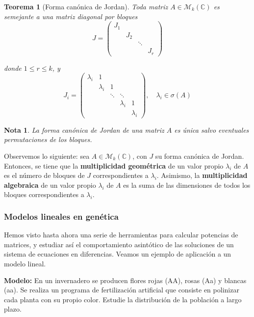 \documentclass[11pt, a4paper]{article}
\newif\IfInSansMode
\numberwithin{equation}{section}
\newcommand{\la}{\lambda}
\theoremstyle{theorem-style}
\newtheorem{nth}{Teorema}[section]
\theoremstyle{definition-style}
\theoremstyle{remark-style}
\newtheorem*{nota}{Nota}
\theoremstyle{example-style}
\begin{document}
\begin{nth}[Forma canónica de Jordan]
  Toda matriz $A \in \mathcal M_k (\mathbb C)$ es semejante a una matriz
  diagonal por bloques $$ J =
  \begin{pmatrix}
    J_1 & & & \\
    & J_2 & & \\
    & & \ddots & \\
    & & & J_r
  \end{pmatrix}$$

  donde $1 \leq r \leq k$, y $$J_i = 
  \begin{pmatrix}
	\la_i & 1\\
	& \la_i & 1 \\
	& & \ddots & \ddots \\
	& & & \la_i & 1 \\
	& & & & \la_i
\end{pmatrix}, \quad \lambda_i \in \sigma(A)$$

\end{nth}

\begin{nota}
	La forma canónica de Jordan de una matriz $A$ es única salvo eventuales permutaciones de los bloques.
\end{nota}

Observemos lo siguiente: sea $A \in \mathcal M_k(\mathbb{C})$, con $J$ su forma canónica de Jordan. Entonces, se tiene que la \textbf{multiplicidad geométrica} de un valor propio $\lambda_i$ de $A$ es el número de bloques de $J$ correspondientes a $\lambda_i$. Asimismo, la \textbf{multiplicidad algebraica} de un valor propio $\lambda_i$ de $A$ es la suma de las dimensiones de todos los bloques correspondientes a $\lambda_i$.

\subsubsection{Modelos lineales en genética}

Hemos visto hasta ahora una serie de herramientas para calcular potencias de matrices, y estudiar así el comportamiento asintótico de las soluciones de un sistema de ecuaciones en diferencias. Veamos un ejemplo de aplicación a un modelo lineal.

\textbf{Modelo:} En un invernadero se producen flores rojas (AA), rosas (Aa) y blancas (aa). Se
realiza un programa de fertilización artificial que consiste en polinizar cada
planta con su propio color. Estudie la distribución de la población a largo
plazo.
\end{document}
